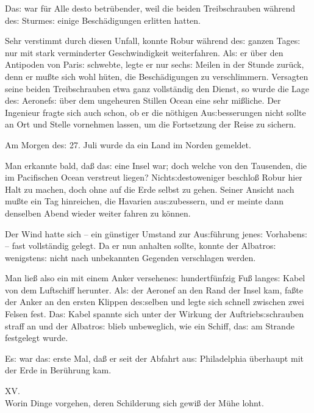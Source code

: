 \documentclass[oneside,12pt]{book}
\newenvironment{antiqua}{\normalfont}{}
\newcommand{\s}{s:}
\begin{document}
Da{\s} war f\"ur Alle desto betr\"ubender, weil die beiden
Treibschrauben w\"ahrend de{\s} Sturme{\s} einige Besch\"adigungen
erlitten hatten.

Sehr verstimmt durch diesen Unfall, konnte Robur w\"ahrend de{\s}
ganzen Tage{\s} nur mit stark verminderter Geschwindigkeit
weiterfahren. Al{\s} er \"uber den Antipoden von Pari{\s} schwebte,
legte er nur sech{\s} Meilen in der Stunde zur\"uck, denn er
mu{\ss}te sich wohl h\"uten, die Besch\"adigungen zu verschlimmern.
Versagten seine beiden Treibschrauben etwa ganz vollst\"andig den
Dienst, so wurde die Lage de{\s} Aeronef{\s} \"uber dem ungeheuren
Stillen Ocean eine sehr mi{\ss}liche. Der Ingenieur fragte sich auch
schon, ob er die n\"othigen Au{\s}besserungen nicht sollte an Ort und
Stelle vornehmen lassen, um die Fortsetzung der Reise zu sichern.

Am Morgen de{\s} 27. Juli wurde da ein Land im Norden gemeldet.

Man erkannte bald, da{\ss} da{\s} eine Insel war; doch welche von den
Tausenden, die im Pacifischen Ocean verstreut liegen?
Nicht{\s}destoweniger beschlo{\ss} Robur hier Halt zu machen, doch
ohne auf die Erde selbst zu gehen. Seiner Ansicht nach mu{\ss}te ein
Tag hinreichen, die Havarien au{\s}zubessern, und er meinte dann
denselben Abend wieder weiter fahren zu k\"onnen.

Der Wind hatte sich -- ein g\"unstiger Umstand zur Au{\s}f\"uhrung
jene{\s} Vorhaben{\s} -- fast vollst\"andig gelegt. Da er nun
anhalten sollte, konnte der {\glqq}Albatro{\s}{\grqq} wenigsten{\s}
nicht nach unbekannten Gegenden verschlagen werden.

Man lie{\ss} also ein mit einem Anker versehene{\s} hundertf\"unfzig
Fu{\ss} lange{\s} Kabel von dem Luftschiff herunter. Al{\s} der
Aeronef an den Rand der Insel kam, fa{\ss}te der Anker an den ersten
Klippen de{\s}selben und legte sich schnell zwischen zwei Felsen
fest. Da{\s} Kabel spannte sich unter der Wirkung der
Auftrieb{\s}schrauben straff an und der {\glqq}Albatro{\s}{\grqq}
blieb unbeweglich, wie ein Schiff, da{\s} am Strande festgelegt
wurde.

E{\s} war da{\s} erste Mal, da{\ss} er seit der Abfahrt au{\s}
Philadelphia \"uberhaupt mit der Erde in Ber\"uhrung kam.



\newpage\begin{center}\label{kap15}
{\large \begin{antiqua}XV.\end{antiqua}\\
Worin Dinge vorgehen, deren Schilderung sich gewi{\ss} der M\"uhe
lohnt.\\\bigskip}
\end{center}
\end{document}
